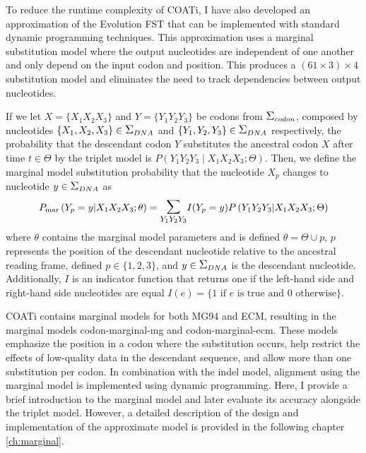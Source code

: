 To reduce the runtime complexity of COATi, I have also developed an approximation of the Evolution FST that can be implemented with standard dynamic programming techniques. This approximation uses a marginal substitution model where the output nucleotides are independent of one another and only depend on the input codon and position. This produces a $\left(61 \times 3 \right) \times 4$ substitution model and eliminates the need to track dependencies between output nucleotides. 

If we let $X= \{X_1 X_2 X_3\}$ and $Y = \{Y_1 Y_2 Y_3\}$ be codons from $\grande{\Sigma}_{codon}$, composed by nucleotides $\{X_1,X_2,X_3\} \in \grande{\Sigma}_{DNA}$ and $\{Y_1,Y_2,Y_3\} \in \grande{\Sigma}_{DNA}$ respectively, the probability that the descendant codon $Y$ substitutes the ancestral codon $X$ after time $t \in \Theta$ by the triplet model is $P\left(Y_1 Y_2 Y_3 \middle| X_1 X_2 X_3; \Theta \right)$. Then, we define the marginal model substitution probability that the nucleotide $X_p$ changes to nucleotide $y \in \grande{\Sigma}_{DNA}$ as
%
\begin{equation} \label{eq:mar-sum-ch2}
P_\text{mar}\left(Y_p = y \middle| X_1 X_2 X_3;\theta \right) =
\grande{\sum}_{Y_1 Y_2 Y_3} I(Y_p = y) P\left(Y_1 Y_2 Y_3 \middle| X_1 X_2 X_3;\Theta \right)
\end{equation}
%
where $\theta$ contains the marginal model parameters and is defined $\theta = \Theta \cup p$, $p$ represents the position of the descendant nucleotide relative to the ancestral reading frame, defined $p \in \{1, 2, 3\}$, and $y \in \grande{\Sigma}_{DNA}$ is the descendant nucleotide. Additionally, $I$ is an indicator function that returns one if the left-hand side and right-hand side nucleotides are equal
%
$I(e) = \{ 1 \text{ if $e$ is true and } 0 \text{ otherwise}\}$.
%

COATi contains marginal models for both MG94 and ECM, resulting in the marginal models codon-marginal-mg and codon-marginal-ecm.
These models emphasize the position in a codon where the substitution occurs, help restrict the effects of low-quality data in the descendant sequence, and allow more than one substitution per codon.
In combination with the indel model, alignment using the marginal model is implemented using dynamic programming. Here, I provide a brief introduction to the marginal model and later evaluate its accuracy alongside the triplet model. However, a detailed description of the design and implementation of the approximate model is provided in the following chapter \ref{ch:marginal}.

